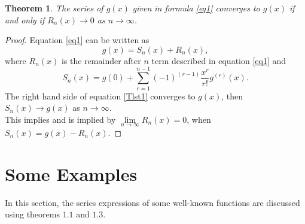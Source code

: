 \documentclass{amsart}
\newtheorem{theorem}{Theorem}[section]
\theoremstyle{definition}
\theoremstyle{remark}
\numberwithin{equation}{section}
\begin{document}
\begin{theorem}
The series of $g(x)$ given in formula \eqref{eq1} converges to $g(x)$ if and only if $R_n(x) \rightarrow 0$ as $n \rightarrow \infty$.
\end{theorem}
\begin{proof}
Equation \eqref{eq1} can be written as
\begin{equation}
g(x)=S_n(x) + R_n(x),\label{Tlst1}
\end{equation}
where $R_n(x)$ is the remainder after $n$ term described in equation \eqref{eq1} and
\begin{equation}
S_n(x) = g(0) + \sum_{r=1}^{n-1} (-1)^{(r-1)} \frac{x^r}{r!} g^{(r)}(x). \label{TlstSn}
\end{equation}
The right hand side of equation \eqref{Tlst1} converges to $g(x)$, then $S_n(x) \rightarrow g(x)$ as $n \rightarrow \infty$.\\
This implies and is implied by $\displaystyle{ \lim \limits_{n \rightarrow\infty} R_n(x)=0}$, when $\displaystyle S_n(x)=g(x)-R_n(x).$
\end{proof}


\section{Some Examples}
In this section, the series expressions of some well-known functions are discussed using theorems $1.1$ and $1.3$.
\end{document}
